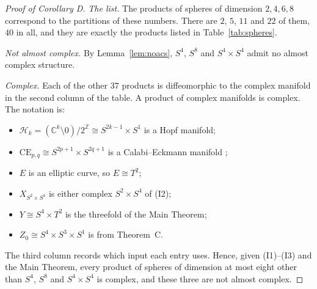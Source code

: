 \documentclass{article}
\DeclareMathOperator{\Z}{\mathbb{Z}}
\theoremstyle{definition}
\theoremstyle{plain}
\newcommand{\C}{\mathbb{C}}
\begin{document}
\begin{proof}[Proof of Corollary D]
\emph{The list.} The products of spheres of dimension $2,4,6,8$ correspond to the
partitions of these numbers. There are $2$, $5$, $11$ and $22$ of them, $40$ in all, and
they are exactly the products listed in Table~\ref{tab:spheres}.

\emph{Not almost complex.} By Lemma~\ref{lem:noacs}, $S^4$, $S^8$ and $S^4\times S^4$ admit
no almost complex structure.

\emph{Complex.} Each of the other $37$ products is diffeomorphic to the complex manifold
in the second column of the table. A product of complex manifolds is complex. The
notation is:
\begin{itemize}
\item $\mathcal H_k=(\C^k\setminus0)/2^{\Z}\cong S^{2k-1}\times S^1$ is a Hopf manifold;
\item $\mathrm{CE}_{p,q}\cong S^{2p+1}\times S^{2q+1}$ is a Calabi--Eckmann manifold
  \cite{CalabiEckmann53};
\item $E$ is an elliptic curve, so $E\cong T^2$;
\item $X_{S^2\times S^4}$ is either complex $S^2\times S^4$ of (I2);
\item $Y\cong S^4\times T^2$ is the threefold of the Main Theorem;
\item $Z_0\cong S^4\times S^3\times S^1$ is from Theorem~C.
\end{itemize}
The third column records which input each entry uses. Hence, given (I1)--(I3) and the
Main Theorem, every product of spheres of dimension at most eight other than $S^4$, $S^8$
and $S^4\times S^4$ is complex, and these three are not almost complex.
\end{proof}
\end{document}
